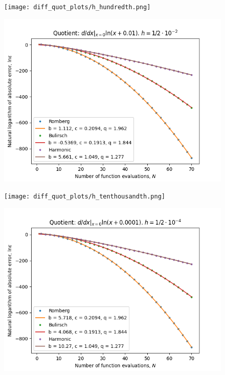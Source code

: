 \begin{figure}[H]
\centering
\begin{minipage}{0.45\textwidth}
\centering
\texttt{[image: diff\_quot\_plots/h\_hundredth.png]}
\end{minipage}
\begin{minipage}{0.45\textwidth}
\centering
\includegraphics[scale=0.45]{diff_quot_plots/h_hundredth_hp_trend.png}
\end{minipage}
\end{figure}

\begin{figure}[H]
\centering
\begin{minipage}{0.45\textwidth}
\centering
\texttt{[image: diff\_quot\_plots/h\_tenthousandth.png]}
\end{minipage}
\begin{minipage}{0.45\textwidth}
\centering
\includegraphics[scale=0.45]{diff_quot_plots/h_tenthousandth_hp_trend.png}
\end{minipage}
\end{figure}

